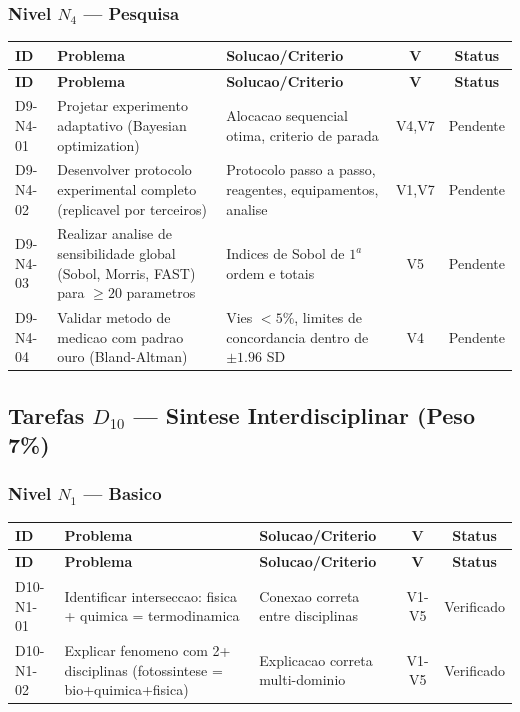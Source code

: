 \subsubsection{Nivel $N_4$ --- Pesquisa}

\begin{longtable}{|p{2.0cm}|p{4.2cm}|p{4.2cm}|c|c|}
\hline
\textbf{ID} & \textbf{Problema} & \textbf{Solucao/Criterio} & \textbf{V} & \textbf{Status} \\
\hline
\endfirsthead
\hline
\textbf{ID} & \textbf{Problema} & \textbf{Solucao/Criterio} & \textbf{V} & \textbf{Status} \\
\hline
\endhead
\hline
\endfoot
D9-N4-01 & Projetar experimento adaptativo (Bayesian optimization) & Alocacao sequencial otima, criterio de parada & V4,V7 & Pendente \\
\hline
D9-N4-02 & Desenvolver protocolo experimental completo (replicavel por terceiros) & Protocolo passo a passo, reagentes, equipamentos, analise & V1,V7 & Pendente \\
\hline
D9-N4-03 & Realizar analise de sensibilidade global (Sobol, Morris, FAST) para $\geq 20$ parametros & Indices de Sobol de $1^{a}$ ordem e totais & V5 & Pendente \\
\hline
D9-N4-04 & Validar metodo de medicao com padrao ouro (Bland-Altman) & Vies $<5\%$, limites de concordancia dentro de $\pm 1.96$ SD & V4 & Pendente \\
\hline
\end{longtable}

\subsection{Tarefas $D_{10}$ --- Sintese Interdisciplinar (Peso 7\%)}

\subsubsection{Nivel $N_1$ --- Basico}

\begin{longtable}{|p{2.0cm}|p{4.2cm}|p{4.2cm}|c|c|}
\hline
\textbf{ID} & \textbf{Problema} & \textbf{Solucao/Criterio} & \textbf{V} & \textbf{Status} \\
\hline
\endfirsthead
\hline
\textbf{ID} & \textbf{Problema} & \textbf{Solucao/Criterio} & \textbf{V} & \textbf{Status} \\
\hline
\endhead
\hline
\endfoot
D10-N1-01 & Identificar interseccao: fisica + quimica = termodinamica & Conexao correta entre disciplinas & V1-V5 & Verificado \\
\hline
D10-N1-02 & Explicar fenomeno com 2+ disciplinas (fotossintese = bio+quimica+fisica) & Explicacao correta multi-dominio & V1-V5 & Verificado \\
\hline
\end{longtable}

